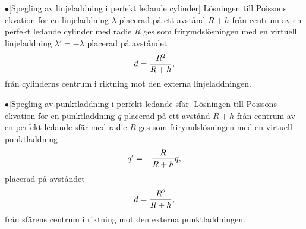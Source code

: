 {{\item{$\bullet$}{[Spegling av linjeladdning i perfekt ledande cylinder]
  L{\"o}sningen till Poissons ekvation f{\"o}r en linjeladdning $\lambda$
  placerad p{\aa} ett avst{\aa}nd $R+h$ fr{\aa}n centrum av en perfekt ledande
  cylinder med radie $R$ ges som fri\-rymds\-l{\"o}s\-ningen med en virtuell
  linjeladdning $\lambda'=-\lambda$ placerad p{\aa} avst{\aa}ndet
  $$
    d={{R^2}\over{R+h}},
  $$
  fr{\aa}n cylinderns centrum i riktning mot den externa linjeladdningen.}
\item{$\bullet$}{[Spegling av punktladdning i perfekt ledande sf{\"a}r]
  L{\"o}sningen till Poissons ekvation f{\"o}r en punktladdning $q$ placerad
  p{\aa} ett avst{\aa}nd $R+h$ fr{\aa}n centrum av en perfekt ledande sf{\"a}r
  med radie $R$ ges som fri\-rymds\-l{\"o}s\-ningen med en virtuell
  punktladdning
  $$
    q'=-{{R}\over{R+h}}q,
  $$
  placerad p{\aa} avst{\aa}ndet
  $$
    d={{R^2}\over{R+h}},
  $$
  fr{\aa}n sf{\"a}rens centrum i riktning mot den externa punktladdningen.}

}}
